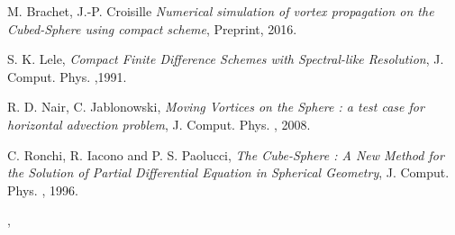 \documentclass[10pt]{article}
\def\auteurenbasdepage#1#2#3{\small{\bf #1}, \small{#2}\\ \small{\tt #3}\\ }
\begin{document}

\begin{thebibliography}{99}

 {\sc M. Brachet, J.-P. Croisille} {\sl Numerical simulation of vortex propagation on the Cubed-Sphere using compact scheme}, Preprint, 2016.

 {\sc S. K. Lele}, {\sl Compact Finite Difference Schemes with Spectral-like Resolution}, J. Comput. Phys. ,1991.

 {\sc R. D. Nair, C. Jablonowski}, {\sl Moving Vortices on the Sphere : a test case for horizontal advection problem}, J. Comput. Phys. , 2008.

 {\sc C. Ronchi, R. Iacono and P. S. Paolucci}, {\sl The Cube-Sphere : A New Method for the Solution of Partial Differential Equation in Spherical Geometry}, J. Comput. Phys. , 1996.

\end{thebibliography}
%
\vfill
\auteurenbasdepage{\NomOrateur}{\AdresseLongueOrateur}{\EmailOrateur}
%
\end{document}
